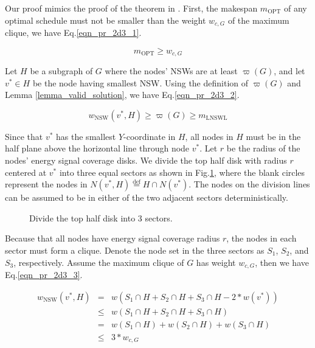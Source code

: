 \documentclass[12pt,journal,onecolumn,draftcls]{IEEEtran}
\begin{document}
\begin{IEEEproof}
Our proof mimics the proof of the theorem in \cite{Marathe1995}. First, the makespan $m_\text{OPT}$ of any optimal schedule must not be smaller than the weight $w_{c,G}$ of the maximum clique, we have Eq.\eqref{eqn_pr_2d3_1}.

\begin{equation}
\label{eqn_pr_2d3_1}
m_\text{OPT}{\geq}w_{c,G}
\end{equation}

Let $H$ be a subgraph of $G$ where the nodes' NSWs are at least $\varpi(G)$, and let $v^{*}{\in}H$ be the node having smallest NSW. Using the definition of $\varpi(G)$ and Lemma \ref{lemma_valid_solution}, we have Eq.\eqref{eqn_pr_2d3_2}.

\begin{equation}
\label{eqn_pr_2d3_2}
w_\text{NSW}(v^{*},H){\geq}\varpi(G){\geq}m_\text{LNSWL}
\end{equation}

Since that $v^{*}$ has the smallest $Y$-coordinate in $H$, all nodes in $H$ must be in the half plane above the horizontal line through node $v^{*}$. Let $r$ be the radius of the nodes' energy signal coverage disks. We divide the top half disk with radius $r$ centered at $v^{*}$ into three equal sectors as shown in Fig.\ref{fig_2d3part}, where the blank circles represent the nodes in $N(v^{*},H)\mathop{=}\limits^\text{def}H{\cap}N(v^{*})$. The nodes on the division lines can be assumed to be in either of the two adjacent sectors deterministically.

\begin{figure}[htb]
\caption{Divide the top half disk into 3 sectors.}
\label{fig_2d3part}
\end{figure}

Because that all nodes have energy signal coverage radius $r$, the nodes in each sector must form a clique. Denote the node set in the three sectors as $S_1$, $S_2$, and $S_3$, respectively. Assume the maximum clique of $G$ has weight $w_{c,G}$, then we have Eq.\eqref{eqn_pr_2d3_3}.

\begin{equation}
\label{eqn_pr_2d3_3}
\begin{array}{rcl}
w_\text{NSW}(v^{*},H)&{=}&w(S_1{\cap}H{+}S_2{\cap}H{+}S_3{\cap}H{-}2{*}w(v^{*}))\\
&{\leq}&w(S_1{\cap}H{+}S_2{\cap}H{+}S_3{\cap}H)\\
&{=}&w(S_1{\cap}H){+}w(S_2{\cap}H){+}w(S_3{\cap}H)\\
&{\leq}&3{*}w_{c,G}
\end{array}
\end{equation}


\end{IEEEproof}
\end{document}
